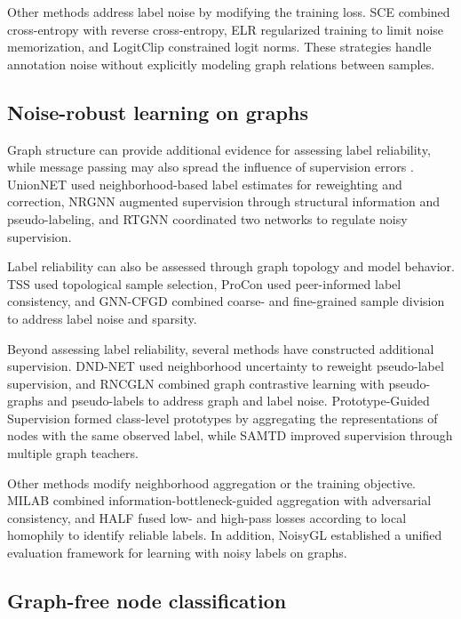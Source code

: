 \documentclass[a4paper,fleqn]{cas-sc}
\theoremstyle{definition}
\theoremstyle{plain}
\begin{document}
Other methods address label noise by modifying the training loss. SCE \cite{ref23} combined cross-entropy with reverse cross-entropy, ELR \cite{ref24} regularized training to limit noise memorization, and LogitClip \cite{ref26} constrained logit norms. These strategies handle annotation noise without explicitly modeling graph relations between samples.

\subsection{Noise-robust learning on graphs}\label{sec:2.2}

Graph structure can provide additional evidence for assessing label reliability, while message passing may also spread the influence of supervision errors \cite{ref6}. UnionNET \cite{ref27} used neighborhood-based label estimates for reweighting and correction, NRGNN \cite{ref7} augmented supervision through structural information and pseudo-labeling, and RTGNN \cite{ref8} coordinated two networks to regulate noisy supervision.

Label reliability can also be assessed through graph topology and model behavior. TSS \cite{ref9} used topological sample selection, ProCon \cite{ref29} used peer-informed label consistency, and GNN-CFGD \cite{ref31} combined coarse- and fine-grained sample division to address label noise and sparsity.

Beyond assessing label reliability, several methods have constructed additional supervision. DND-NET \cite{ref32} used neighborhood uncertainty to reweight pseudo-label supervision, and RNCGLN \cite{ref33} combined graph contrastive learning with pseudo-graphs and pseudo-labels to address graph and label noise. Prototype-Guided Supervision \cite{ref34} formed class-level prototypes by aggregating the representations of nodes with the same observed label, while SAMTD \cite{ref36} improved supervision through multiple graph teachers.

Other methods modify neighborhood aggregation or the training objective. MILAB \cite{ref38} combined information-bottleneck-guided aggregation with adversarial consistency, and HALF \cite{ref39} fused low- and high-pass losses according to local homophily to identify reliable labels. In addition, NoisyGL \cite{ref6} established a unified evaluation framework for learning with noisy labels on graphs.

\subsection{Graph-free node classification}\label{sec:2.3}
\end{document}

